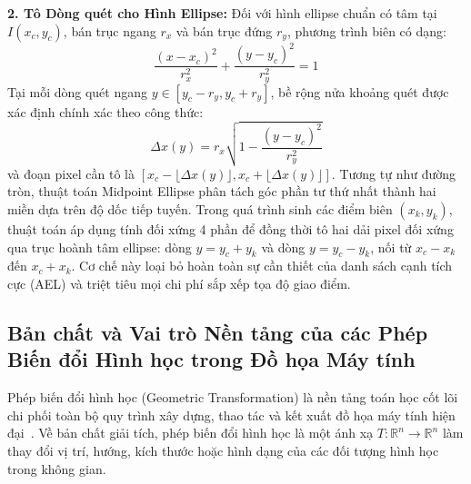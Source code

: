 \textbf{2. Tô Dòng quét cho Hình Ellipse:}
Đối với hình ellipse chuẩn có tâm tại $I(x_c, y_c)$, bán trục ngang $r_x$ và bán trục đứng $r_y$, phương trình biên có dạng:
\begin{equation}
\frac{(x - x_c)^2}{r_x^2} + \frac{(y - y_c)^2}{r_y^2} = 1
\end{equation}
Tại mỗi dòng quét ngang $y \in [y_c - r_y, y_c + r_y]$, bề rộng nửa khoảng quét được xác định chính xác theo công thức:
\begin{equation}
\Delta x(y) = r_x \sqrt{1 - \frac{(y - y_c)^2}{r_y^2}}
\end{equation}
và đoạn pixel cần tô là $[x_c - \lfloor \Delta x(y) \rfloor, x_c + \lfloor \Delta x(y) \rfloor]$. Tương tự như đường tròn, thuật toán Midpoint Ellipse phân tách góc phần tư thứ nhất thành hai miền dựa trên độ dốc tiếp tuyến. Trong quá trình sinh các điểm biên $(x_k, y_k)$, thuật toán áp dụng tính đối xứng 4 phần để đồng thời tô hai dải pixel đối xứng qua trục hoành tâm ellipse: dòng $y = y_c + y_k$ và dòng $y = y_c - y_k$, nối từ $x_c - x_k$ đến $x_c + x_k$. Cơ chế này loại bỏ hoàn toàn sự cần thiết của danh sách cạnh tích cực (AEL) và triệt tiêu mọi chi phí sắp xếp tọa độ giao điểm.

\subsection{Bản chất và Vai trò Nền tảng của các Phép Biến đổi Hình học trong Đồ họa Máy tính}
\label{subsec:role_geometric_transformations}

Phép biến đổi hình học (Geometric Transformation) là nền tảng toán học cốt lõi chi phối toàn bộ quy trình xây dựng, thao tác và kết xuất đồ họa máy tính hiện đại~\citep{hearn2004computer,foley1996computer}. Về bản chất giải tích, phép biến đổi hình học là một ánh xạ $T: \mathbb{R}^n \to \mathbb{R}^n$ làm thay đổi vị trí, hướng, kích thước hoặc hình dạng của các đối tượng hình học trong không gian.

